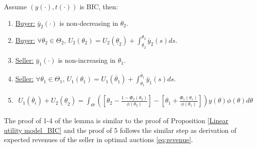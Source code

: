 \documentclass[11pt]{elegantbook}
\begin{document}
\begin{lemma}
    Assume $(y(\cdot),t(\cdot))$ is BIC, then:
    \begin{enumerate}
        \item \underline{Buyer:} $\bar{y}_2(\cdot)$ is non-decreasing in $\theta_2$.
        \item \underline{Buyer:} $\forall \theta_2\in\Theta_2$, $U_2(\theta_2)=U_2(\underline{\theta}_2)+\int_{\underline{\theta}_2}^{\theta_2}\bar{y}_2(s)ds$.
        \item \underline{Seller:} $\bar{y}_1(\cdot)$ is non-increasing in $\theta_1$.
        \item \underline{Seller:} $\forall \theta_1\in\Theta_1$, $U_1(\theta_1)=U_1(\overline{\theta}_1)+\int_{\theta_1}^{\overline{\theta}_1}\bar{y}_1(s)ds$.
        \item
        \begin{equation}
            \begin{aligned}
                U_1(\overline{\theta}_i)+U_2(\underline{\theta}_2)=\int_\Theta \left(\left[\theta_2-\frac{1-\Phi_2(\theta_2)}{\phi(\theta_2)}\right]-\left[\theta_1+\frac{\Phi_1(\theta_1)}{\phi(\theta_1)}\right]\right)y(\theta)\phi(\theta)d\theta
            \end{aligned}
            \nonumber
        \end{equation}
    \end{enumerate}
\end{lemma}
The proof of 1-4 of the lemma is similar to the proof of Proposition \ref{Linear utility model_BIC} and the proof of 5 follows the similar step as derivation of expected revenues of the seller in optimal auctions \eqref{eq:revenue}.
\end{document}

